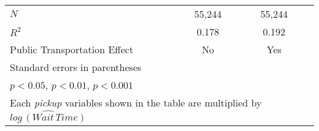 \begin{table}[h]
{\begin{center}
\begin{tabular}{l*{2}{cc}}
\(N\)       &       55,244         &            &       55,244         &            \\
\(R^{2}\)   &       0.178         &            &       0.192         &            \\
Public Transportation Effect &         No      &      &             Yes&        \\
\hline\hline
\multicolumn{5}{l}{\footnotesize Standard errors in parentheses}\\
\multicolumn{5}{l}{\footnotesize \sym{*} \(p<0.05\), \sym{**} \(p<0.01\), \sym{***} \(p<0.001\)}\\
\multicolumn{5}{l}{\footnotesize Each \textit{pickup} variables shown in the table are multiplied by ${\widehat{log\, (Wait\, Time)}}$}\\
\end{tabular}
\end{center}
}


\end{table}
